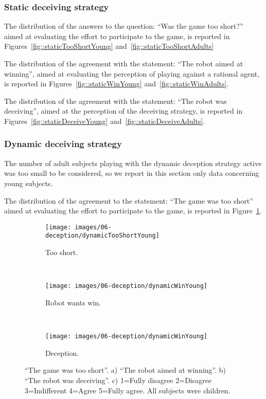\subsubsection{Static deceiving strategy}
The distribution of the answers to the question: ``Was the game too short?'' aimed at evaluating the effort to  participate to the game, is reported in Figures~\ref{fig::staticTooShortYoung} and~\ref{fig::staticTooShortAdults}

The distribution of the agreement with the statement: ``The robot aimed at winning'', aimed at evaluating the perception of playing against a rational agent, is reported in Figures~\ref{fig::staticWinYoung} and~\ref{fig::staticWinAdults}.

The distribution of the agreement with the statement: ``The robot was deceiving'', aimed at the perception of the deceiving strategy, is reported in Figures~\ref{fig::staticDeceiveYoung} and~\ref{fig::staticDeceiveAdults}.

\subsubsection{Dynamic deceiving strategy}
The number of adult subjects playing with the dynamic deception strategy active was too small to be considered, so we report in this section only data concerning young subjects.

The distribution of the agreement to the statement: ``The game was too short'' aimed at evaluating the effort to  participate to the game, is reported in Figure~\ref{fig::dynamictooShortYoung}.

\begin{figure}[h]
    \centering
    \begin{subfigure}[h]{0.49\columnwidth}
        \centering
        \texttt{[image: images/06-deception/dynamicTooShortYoung]}
        \caption{Too short.} 
        \label{fig::dynamictooShortYoung}
    \end{subfigure}
    ~
    \begin{subfigure}[h]{0.49\columnwidth}
        \centering
        \texttt{[image: images/06-deception/dynamicWinYoung]}
        \caption{Robot wants win.}
        \label{fig::dynamicWinYoung}
    \end{subfigure}
    ~
    \begin{subfigure}[h]{0.49\columnwidth}
        \centering
        \texttt{[image: images/06-deception/dynamicWinYoung]}
        \caption{Deception.}
        \label{fig::dynamicDeceiveYoung}
    \end{subfigure}
    \caption{``The game was too short''. a) ``The robot aimed at winning''. b) ``The robot was deceiving''. c) 1=Fully disagree 2=Disagree 3=Indifferent 4=Agree 5=Fully agree. All subjects were children.}
\end{figure}

